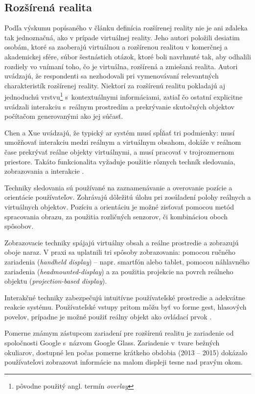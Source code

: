 \subsection{Rozšírená realita}
Podľa výskumu popísaného v článku \cite{speicherWhatMixedReality2019a} definícia rozšírenej reality nie je ani zďaleka tak jednoznačná, ako v prípade virtuálnej reality. 
Jeho autori položili desiatim osobám, ktoré sa zaoberajú virtuálnou a rozšírenou realitou v komerčnej a akademickej sfére, súbor šestnástich otázok, ktoré boli 
navrhnuté tak, aby odhalili rozdiely vo vnímaní toho, čo je virtuálna, rozšírená a zmiešaná realita. Autori uvádzajú, že respondenti sa nezhodovali pri vymenovávaní
relevantných charakteristík rozšírenej reality. Niektorí za rozšírenú realitu pokladajú aj jednoduchú vrstvu\footnote{pôvodne použitý angl. termín \emph{overlay}} 
s~kontextuálnymi informáciami, zatiaľ čo ostatní explicitne uvádzali interakciu s~reálnym prostredím a prekrývanie skutočných objektov počítačom generovanými 
ako jej súčasť.

Chen a Xue uvádzajú, že typický \acrshort{ar} systém musí spĺňať tri podmienky: musí umožňovať interakciu medzi reálnym a virtuálnym obsahom, dokáže v reálnom čase 
prekrývať reálne objekty virtuálnymi, a musí pracovať v trojrozmernom priestore. Takáto funkcionalita vyžaduje použitie rôznych techník sledovania, zobrazovania a
interakcie \cite{chenRenaissanceAugmentedReality2022}.

Techniky sledovania sú používané na zaznamenávanie a overovanie pozície a orientácie používateľov. Zohrávajú dôležitú úlohu pri zosúladení polohy reálnych a virtuálnych
objektov. Pozíciu a orientáciu je možné zisťovať pomocou metód spracovania obrazu, za použitia rozličných senzorov, či kombináciou oboch spôsobov.

Zobrazovacie techniky spájajú virtuálny obsah a reálne prostredie a zobrazujú oboje naraz. V praxi sa uplatnili tri spôsoby zobrazovania: pomocou ručného zariadenia 
(\emph{handheld display}) {--} napr. smartfón alebo tablet, pomocou náhlavného zariadenia (\emph{headmounted-display}) a za použitia projekcie na povrch reálneho objektu 
(\emph{projection-based display}).

Interakčné techniky zabezpečujú intuitívne používateľské prostredie a adekvátne reakcie systému. Používateľské vstupy pritom môžu byť vo forme gest, hlasových povelov,
prípadne je možné použiť reálny objekt ako ovládací prvok \cite{chenRenaissanceAugmentedReality2022}.

Pomerne známym zástupcom zariadení pre rozšírenú realitu je zariadenie od spoločnosti Google s~názvom Google Glass. Zariadenie v~tvare bežných 
okuliarov, dostupné len počas pomerne krátkeho obdobia (2013 {--} 2015) \cite{brighamRealityCheckBasics2017} dokázalo používateľovi zobrazovat informácie na malom displeji tesne
nad pravým okom. 

